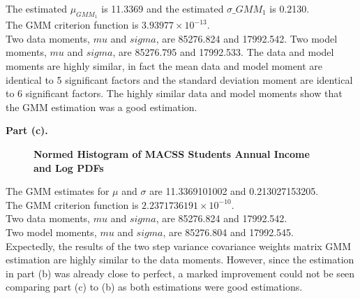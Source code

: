 \documentclass[letterpaper,12pt]{article}
\theoremstyle{definition}
\begin{document}
\flushleft 
The estimated $\mu_{GMM_1}$ is 11.3369 and the estimated $\sigma\_{GMM_1}$ is 0.2130.\\
The GMM criterion function is $3.93977\times10^{-13}$.\\
Two data moments, $mu$ and $sigma$, are 85276.824 and 17992.542.
Two model moments, $mu$ and $sigma$, are 85276.795 and 17992.533.
The data and model moments are highly similar, in fact the mean data and model moment are identical to 5 significant factors and the standard deviation moment are identical to 6 significant factors. The highly similar data and model moments show that the GMM estimation was a good estimation. 

\pagebreak

\textbf{Part (c).} \\
\begin{figure}[htb]\centering\captionsetup{width=4.0in}
  \caption{\textbf{Normed Histogram of MACSS Students Annual Income and Log PDFs}}\label{FigExample}
\end{figure}
\flushleft 
The GMM estimates for $\mu$ and $\sigma$ are 11.3369101002 and 0.213027153205.\\ 
The GMM criterion function is $2.2371736191\times10^{-10}$.\\
Two data moments, $mu$ and $sigma$, are 85276.824 and 17992.542.\\
Two model moments, $mu$ and $sigma$, are 85276.804 and 17992.545.\\
Expectedly, the results of the two step variance covariance weights matrix GMM estimation are highly similar to the data moments. However, since the estimation in part (b) was already close to perfect, a marked improvement could not be seen comparing part (c) to (b) as both estimations were good estimations. 
\end{document}
